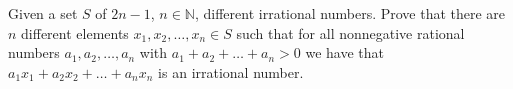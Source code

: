 \documentclass{article}
\begin{document}
	\setlength{\parindent}{0pt}
	Given a set $S$ of $2n-1$, $n \in \mathbb{N}$, different irrational numbers. Prove
	that there are $n$ different elements $x_1, x_2,\dots , x_n \in S$ such that for all nonnegative rational numbers $a_1, a_2, \dots , a_n$ with $a_1 + a_2 + \dots + a_n > 0$ we have
	that $a_1x_1 + a_2x_2 + \dots + a_nx_n$ is an irrational number.
\end{document}
